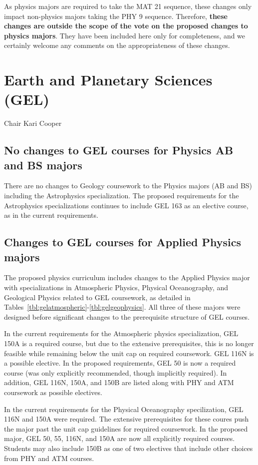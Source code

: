 \documentclass[12pt]{article}
\begin{document}
As physics majors are required to take the MAT 21 sequence, these
changes only impact non-physics majors taking the PHY 9 sequence.
Therefore, {\bf these changes are outside the scope of the vote on the
  proposed changes to physics majors}.  They have been included here
only for completeness, and we certainly welcome any comments on the
appropriateness of these changes.

\newpage
\section{Earth and Planetary Sciences (GEL)}
Chair Kari Cooper

\subsection{No changes to GEL courses for Physics AB and BS majors}

There are no changes to Geology coursework to the Physics majors (AB
and BS) including the Astrophysics specialization.  The proposed
requirements for the Astrophysics specializations continues to include
GEL 163 as an elective course, as in the current requirements.

\subsection{Changes to GEL courses for Applied Physics majors}

The proposed physics curriculum includes changes to the Applied
Physics major with specializations in Atmospheric Physics, Physical
Oceanography, and Geological Physics related to GEL coursework, as
detailed in Tables~\ref{tbl:gelatmospheric}-\ref{tbl:gelgeophysics}.
All three of these majors were designed before significant changes to
the prerequisite structure of GEL courses.

In the current requirements for the Atmospheric physics
specialization, GEL 150A is a required course, but due to the
extensive prerequisites, this is no longer feasible while remaining
below the unit cap on required coursework.  GEL 116N is a possible
elective.  In the proposed requirements, GEL 50 is now a required
course (was only explicitly recommended, though implicitly required).
In addition, GEL 116N, 150A, and 150B are listed along with PHY and
ATM coursework as possible electives.

In the current requirements for the Physical Oceanography
specilization, GEL 116N and 150A were required. The extensive
prerequisites for these coures push the major past the unit cap
guidelines for required coursework.  In the proposed major, GEL 50,
55, 116N, and 150A are now all explicitly required courses.  Students
may also include 150B as one of two electives that include other
choices from PHY and ATM courses.
\end{document}
